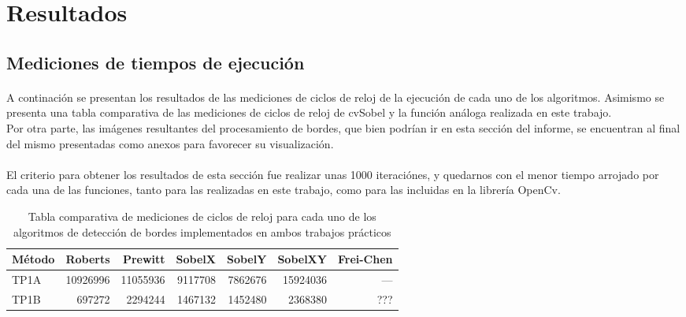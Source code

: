 \documentclass[11pt, a4paper]{article}
\begin{document}
\newpage

\section{Resultados}

\subsection{Mediciones de tiempos de ejecuci\'on}
\paragraph{}
A continaci\'on se presentan los resultados de las mediciones de ciclos de reloj de la ejecuci\'on de cada uno de los algoritmos. Asimismo se presenta una tabla comparativa de las mediciones de ciclos de reloj de cvSobel y la funci\'on an\'aloga realizada en este trabajo.\\
Por otra parte, las im\'agenes resultantes del procesamiento de bordes, que bien podr\'ian ir en esta secci\'on del informe, se encuentran al final del mismo presentadas como anexos para favorecer su visualizaci\'on.

\paragraph{}
El criterio para obtener los resultados de esta secci\'on fue realizar unas 1000 iteraci\'ones, y quedarnos con el menor tiempo arrojado por cada una de las funciones, tanto para las realizadas en este trabajo, como para las incluidas en la librer\'ia OpenCv.

\vspace{1cm}

\begin{table}[ht] %
\centering %
\begin{tabular}{|l|r|r|r|r|r|r|}
\hline
M\'etodo & Roberts & Prewitt & SobelX & SobelY & SobelXY & Frei-Chen \\
\hline
TP1A & 10926996 & 11055936 & 9117708 & 7862676 & 15924036 & --- \\
\hline
TP1B & 697272 & 2294244 & 1467132 & 1452480 & 2368380 & ???\\
\hline
\end{tabular}

\caption{Tabla comparativa de mediciones de ciclos de reloj para cada uno de los algoritmos de detecci\'on de bordes implementados en ambos trabajos pr\'acticos} %
\label{Tiempo metodos} %
\end{table}
\vspace{30pt}
\end{document}
